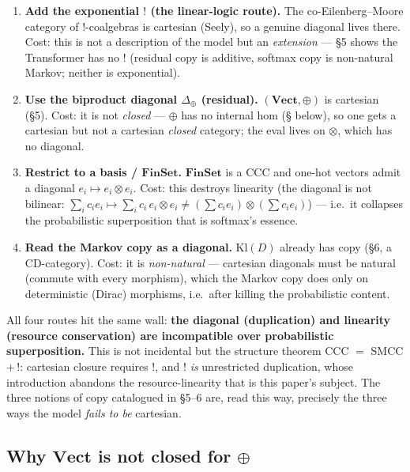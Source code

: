 \documentclass[a4paper,11pt]{article}
\begin{document}
\begin{enumerate}
\def\labelenumi{\arabic{enumi}.}
\item
  \textbf{Add the exponential \(!\) (the linear-logic route).} The
  co-Eilenberg--Moore category of \(!\)-coalgebras is cartesian (Seely),
  so a genuine diagonal lives there. Cost: this is not a description of
  the model but an \emph{extension} --- §5 shows the Transformer has no
  \(!\) (residual copy is additive, softmax copy is non-natural Markov; neither is exponential).
\item
  \textbf{Use the biproduct diagonal \(\Delta_\oplus\) (residual).}
  \((\mathbf{Vect},\oplus)\) is cartesian (§5). Cost: it is not
  \emph{closed} --- \(\oplus\) has no internal hom (§ below), so one
  gets a cartesian but not a cartesian \emph{closed} category; the eval
  lives on \(\otimes\), which has no diagonal.
\item
  \textbf{Restrict to a basis / \(\mathbf{FinSet}\).}
  \(\mathbf{FinSet}\) is a CCC and one-hot vectors admit a diagonal
  \(e_i \mapsto e_i\otimes e_i\). Cost: this destroys linearity (the
  diagonal is not bilinear:
  \(\sum_i c_i e_i \mapsto \sum_i c_i\, e_i\otimes e_i \ne (\sum c_i e_i)\otimes(\sum c_i e_i)\))
  --- i.e.~it collapses the probabilistic superposition that is
  softmax's essence.
\item
  \textbf{Read the Markov copy as a diagonal.} \(\mathrm{Kl}(D)\)
  already has copy (§6, a CD-category). Cost: it is \emph{non-natural}
  --- cartesian diagonals must be natural (commute with every morphism),
  which the Markov copy does only on deterministic (Dirac) morphisms,
  i.e.~after killing the probabilistic content.
\end{enumerate}

All four routes hit the same wall: \textbf{the diagonal (duplication)
and linearity (resource conservation) are incompatible over
probabilistic superposition.} This is not incidental but the structure
theorem CCC \(=\) SMCC \(+\,!\): cartesian closure requires \(!\), and
\(!\) \emph{is} unrestricted duplication, whose introduction abandons
the resource-linearity that is this paper's subject. The three notions
of copy catalogued in §5--6 are, read this way, precisely the three ways
the model \emph{fails to be} cartesian.

\hypertarget{why-mathbfvect-is-not-closed-for-oplus}{%
\subsection{\texorpdfstring{Why \(\mathbf{Vect}\) is not closed for
\(\oplus\)}{Why \textbackslash mathbf\{Vect\} is not closed for \textbackslash oplus}}\label{why-mathbfvect-is-not-closed-for-oplus}}
\end{document}
